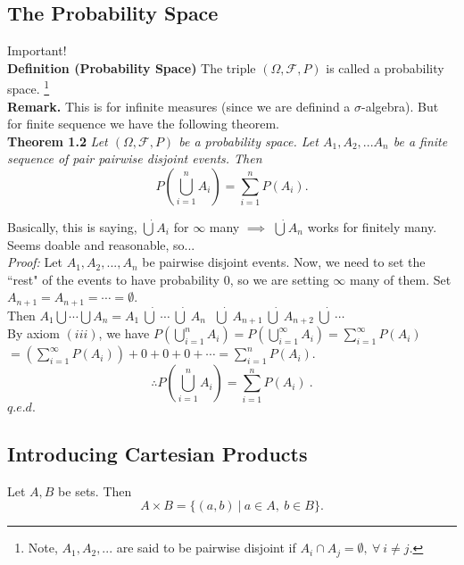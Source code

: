 \documentclass[12pt]{book}
\begin{document}
\subsection{The Probability Space}
Important! \\
\noindent \textbf{Definition (Probability Space)} The triple $(\Omega,\mathcal{F}, P)$ is called a probability space. \footnote{Note, $A_1, A_2, ...$ are said to be pairwise disjoint if $A_i \cap A_j = \emptyset,~\forall~ i\neq j$.}\\

\noindent\textbf{Remark.} This is for infinite measures (since we are definind a $\sigma$-algebra). But for finite sequence we have the following theorem.\\

\noindent \textbf{Theorem 1.2} \textit{Let $(\Omega, \mathcal{F}, P)$ be a probability space. Let $A_1, A_2, ...A_n$ be a finite sequence of pair pairwise disjoint events. Then 
$$P\left( \bigcup\limits_{i=1}^{n} A_i\right) = \sum\limits_{i=1}^{n}P(A_i).$$}

Basically, this is saying, $\dot{\bigcup}A_i$ for $\infty$ many $\implies{}$ $\dot{\bigcup}A_n$ works for finitely many. Seems doable and reasonable, so...\\

\noindent\textit{Proof:} Let $A_1, A_2,...,A_n$ be pairwise disjoint events. 
Now, we need to set the ``rest" of the events to have probability 0, so we are setting $\infty$ many of them.
Set $A_{n+1} = A_{n+1} =\cdots = \emptyset$. \\
Then $A_1 \bigcup \cdots \bigcup A_n=A_1 ~\dot{\bigcup}~ \cdots ~\dot{\bigcup}~A_n ~~~\dot{\bigcup}~ A_{n+1} ~\dot{\bigcup}~ A_{n+2} ~\dot{\bigcup}~ \cdots$\\

\noindent By axiom \hyperlink{axiom(iii)}{$(iii)$}, we have $P\left( \bigcup\limits_{i=1}^{n} A_i\right) = P\left( \bigcup\limits_{i=1}^{\infty} A_i\right) = \sum\limits_{i=1}^{\infty}P(A_i)$ 
$= \left(\sum\limits_{i=1}^{\infty}P(A_i) \right)+0+0+0+\cdots = \sum\limits_{i=1}^{n}P(A_i)$.\\
$$\therefore P\left( \bigcup\limits_{i=1}^{n} A_i\right) = \sum\limits_{i=1}^{n}P(A_i)~.$$\hfill$q.e.d.$


\subsection{Introducing Cartesian Products}
Let $A,B$ be sets. Then
$$A \times B = \Big\{  (a,b) ~\Big|~ a\in A, ~ b\in B \Big\}.$$
\end{document}
